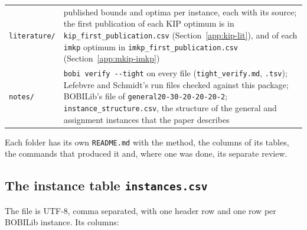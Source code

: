 \begin{center}
\begin{tabular}{@{}p{1.5in}p{4.8in}@{}}
\texttt{literature/} & published bounds and optima per instance, each with its source; the first publication of each KIP optimum is in \texttt{kip\_first\_publication.csv} (Section~\ref{app:kip-lit}), and of each \texttt{imkp} optimum in \texttt{imkp\_first\_publication.csv} (Section~\ref{app:mkip-imkp})\\
\texttt{notes/} & \texttt{bobi verify -{}-tight} on every file (\texttt{tight\_verify.md}, \texttt{.tsv}); Lefebvre and Schmidt's run files checked against this package; BOBILib's file of \texttt{general20-30-20-20-20-2}; \texttt{instance\_structure.csv}, the structure of the general and assignment instances that the paper describes\\
\bottomrule
\end{tabular}
\end{center}

\noindent Each folder has its own \texttt{README.md} with the method, the
columns of its tables, the commands that produced it and, where one was done,
its separate review.

\subsection{The instance table \texttt{instances.csv}}\label{app:data-csv}

The file is UTF-8, comma separated, with one header row and one row per
BOBILib instance. Its columns:


